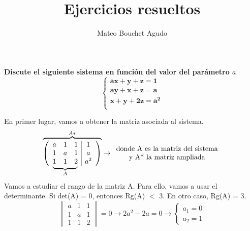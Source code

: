 \documentclass{article}
\author{Mateo Bouchet Agudo}
\title{Ejercicios resueltos}
\newcommand\undermat[2]{%
  \makebox[0pt][l]{$\smash{\underbrace{\phantom{%
    \begin{matrix}#2\end{matrix}}}_{\text{$#1$}}}$}#2}
\begin{document}
\maketitle

\justify

\begin{enumerate}
\textbf{Discute el siguiente sistema en funci\'on del valor del par\'ametro $a$}
$$\left \{\begin{array}{ll}\mathbf{a x + y + z = 1}\\\mathbf{a y + x + z = a}\\\mathbf{x + y + 2 z = a^{2}}\\\end{array}\right.$$
\end{enumerate}
En primer lugar, vamos a obtener la matriz asociada al sistema.
$$\overbrace{\left(\begin{array}{ccc|c}a & 1 & 1 & 1 \\1 & a & 1 & a \\\undermat{A}{1 & 1 & 2} & a^{2} \\\end{array}\right)}^{A*}\rightarrow \begin{array}{cc} \text{donde A es la matriz del sistema} \\\text{y A* la matriz ampliada} \end{array}$$\\

Vamos a estudiar el rango de la matriz A. Para ello, vamos a usar el determinante. Si det(A) = 0, entonces Rg(A) $<$ 3. En otro caso, Rg(A) = 3.
$$\begin{vmatrix}a & 1 & 1 \\1 & a & 1\\1 & 1 & 2\end{vmatrix}=0\to 2 a^{2} - 2 a=0\to\left\{\begin{array}{cc}a_1=0\\a_2=1\end{array}\right.$$
\end{document}

